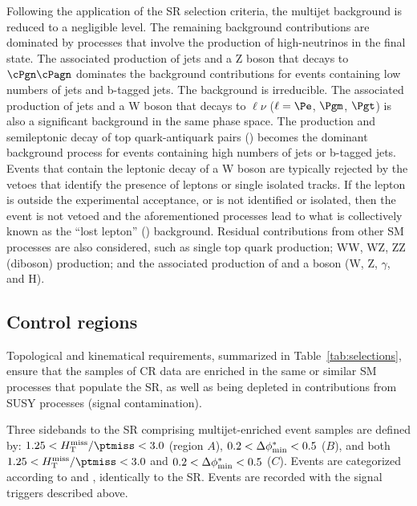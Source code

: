 Following the application of the SR selection criteria, the multijet
background is reduced to a negligible level. The remaining background
contributions are dominated by processes that involve the production
of high-\pt neutrinos in the final state. The associated production of
jets and a Z boson that decays to $\cPgn\cPagn$ dominates the
background contributions for events containing low numbers of jets and
b-tagged jets. The \znunuj background is irreducible. The associated
production of jets and a W boson that decays to $\ell\nu$ ($\ell=\Pe$,
$\Pgm$, $\Pgt$) is also a significant background in the same phase
space. The production and semileptonic decay of top quark-antiquark
pairs (\ttbar) becomes the dominant background process for events
containing high numbers of jets or b-tagged jets. Events that contain
the leptonic decay of a W boson are typically rejected by the vetoes
that identify the presence of leptons or single isolated tracks. If
the lepton is outside the experimental acceptance, or is not
identified or isolated, then the event is not vetoed and the
aforementioned processes lead to what is collectively known as the
``lost lepton'' (\lost) background. Residual contributions from other
SM processes are also considered, such as single top quark production;
WW, WZ, ZZ (diboson) production; and the associated production of
\ttbar and a boson ({\ttbar}W, {\ttbar}Z, {\ttbar}$\gamma$, and
{\ttbar}H).

\subsection{Control regions}
\label{sec:control}

Topological and kinematical requirements, summarized in
Table~\ref{tab:selections}, ensure that the samples of CR data are
enriched in the same or similar SM processes that populate the SR, as
well as being depleted in contributions from SUSY processes (signal
contamination).

Three sidebands to the SR comprising multijet-enriched event samples
are defined by: $1.25 < \mhtmet < 3.0$ (region $A$), $0.2 < \Delta\phi^{*}_\text{min} <
0.5$ ($B$), and both $1.25 < \mhtmet < 3.0$ and $0.2 < \Delta\phi^{*}_\text{min} < 0.5$
($C$). Events are categorized according to \njet and \scalht,
identically to the SR. Events are recorded with the signal triggers
described above.

